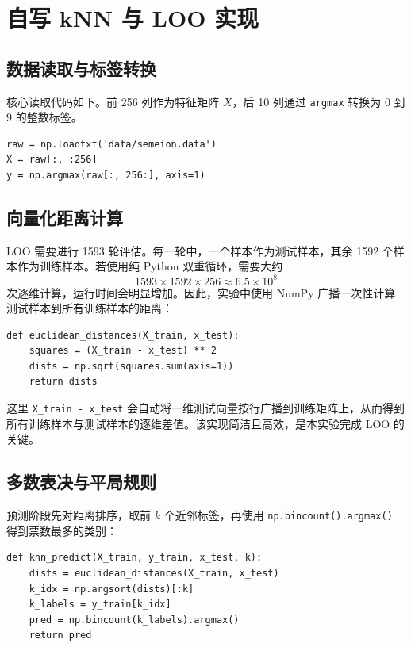 \documentclass[UTF8,zihao=-4]{ctexart}
\begin{document}
\section{自写 kNN 与 LOO 实现}

\subsection{数据读取与标签转换}

核心读取代码如下。前 256 列作为特征矩阵 $X$，后 10 列通过 \texttt{argmax} 转换为 $0$ 到 $9$ 的整数标签。

\begin{lstlisting}[style=pythonstyle,caption={数据读取与标签转换}]
raw = np.loadtxt('data/semeion.data')
X = raw[:, :256]
y = np.argmax(raw[:, 256:], axis=1)
\end{lstlisting}

\subsection{向量化距离计算}

LOO 需要进行 1593 轮评估。每一轮中，一个样本作为测试样本，其余 1592 个样本作为训练样本。若使用纯 Python 双重循环，需要大约
\[
  1593 \times 1592 \times 256 \approx 6.5 \times 10^8
\]
次逐维计算，运行时间会明显增加。因此，实验中使用 NumPy 广播一次性计算测试样本到所有训练样本的距离：

\begin{lstlisting}[style=pythonstyle,caption={欧氏距离的向量化实现}]
def euclidean_distances(X_train, x_test):
    squares = (X_train - x_test) ** 2
    dists = np.sqrt(squares.sum(axis=1))
    return dists
\end{lstlisting}

这里 \texttt{X\_train - x\_test} 会自动将一维测试向量按行广播到训练矩阵上，从而得到所有训练样本与测试样本的逐维差值。该实现简洁且高效，是本实验完成 LOO 的关键。

\subsection{多数表决与平局规则}

预测阶段先对距离排序，取前 $k$ 个近邻标签，再使用 \texttt{np.bincount().argmax()} 得到票数最多的类别：

\begin{lstlisting}[style=pythonstyle,caption={kNN 预测函数}]
def knn_predict(X_train, y_train, x_test, k):
    dists = euclidean_distances(X_train, x_test)
    k_idx = np.argsort(dists)[:k]
    k_labels = y_train[k_idx]
    pred = np.bincount(k_labels).argmax()
    return pred
\end{lstlisting}
\end{document}
